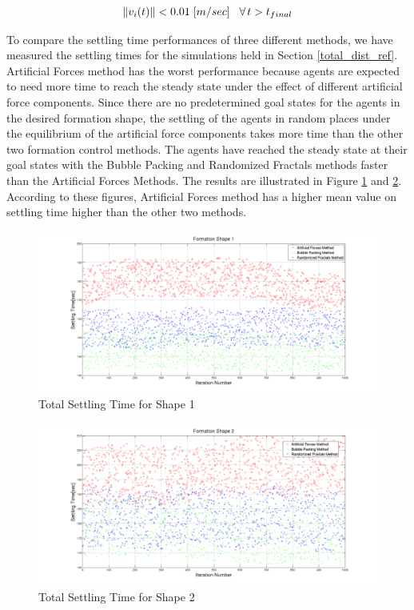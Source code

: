 \begin{equation}
\left\lVert v_i(t)\right\rVert < 0.01 \hspace{0.1cm} [m/sec] \hspace{0.3cm}\forall\hspace{0.05cm} t>t_{final}
\end{equation}
		
To compare the settling time performances of three different methods, we have measured the settling times for the simulations held in Section \ref{total_dist_ref}. Artificial Forces method has the worst performance because agents are expected to need more time to reach the steady state under the effect of different artificial force components. Since there are no predetermined goal states for the agents in the desired formation shape, the settling of the agents in random places under the equilibrium of the artificial force components takes more time than the other two formation control methods. The agents have reached the steady state at their goal states with the Bubble Packing and Randomized Fractals methods faster than the Artificial Forces Methods. The results are illustrated in Figure \ref{settling_1} and \ref{settling_2}. According to these figures, Artificial Forces method has a higher mean value on settling time higher than the other two methods.
		
\begin{figure}[H]
\caption{Total Settling Time for Shape 1} \label{settling_1}
\centerline{\includegraphics[scale = 0.32]{Total_Time_Shape_1}}
\end{figure} 
		
\begin{figure}[H]
\caption{Total Settling Time for Shape 2} \label{settling_2}
\centerline{\includegraphics[scale = 0.32]{Total_Time_Shape_2}}
\end{figure} 

